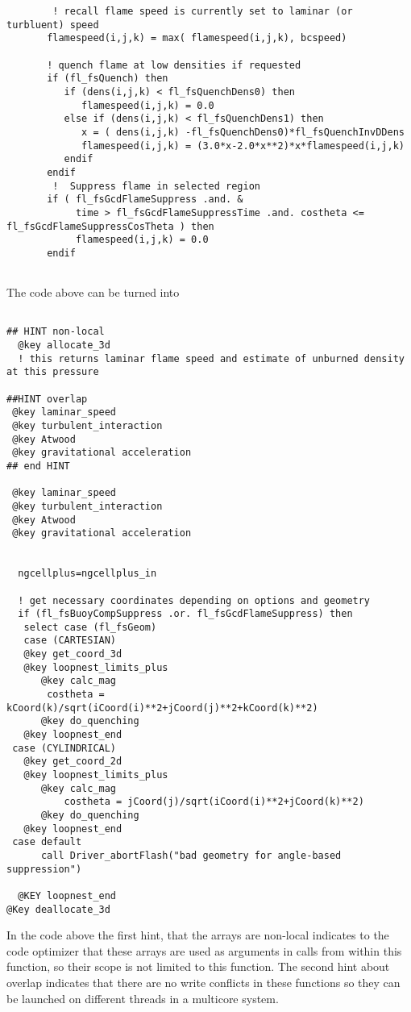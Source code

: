 \documentclass{article}
\begin{document}
\begin{verbatim}
        ! recall flame speed is currently set to laminar (or turbluent) speed
       flamespeed(i,j,k) = max( flamespeed(i,j,k), bcspeed)

       ! quench flame at low densities if requested
       if (fl_fsQuench) then
          if (dens(i,j,k) < fl_fsQuenchDens0) then
             flamespeed(i,j,k) = 0.0
          else if (dens(i,j,k) < fl_fsQuenchDens1) then
             x = ( dens(i,j,k) -fl_fsQuenchDens0)*fl_fsQuenchInvDDens
             flamespeed(i,j,k) = (3.0*x-2.0*x**2)*x*flamespeed(i,j,k)
          endif
       endif
        !  Suppress flame in selected region
       if ( fl_fsGcdFlameSuppress .and. &
            time > fl_fsGcdFlameSuppressTime .and. costheta <= fl_fsGcdFlameSuppressCosTheta ) then
            flamespeed(i,j,k) = 0.0
       endif


\end{verbatim}


The code above can be turned into
\begin{verbatim}

## HINT non-local
  @key allocate_3d
  ! this returns laminar flame speed and estimate of unburned density
at this pressure

##HINT overlap
 @key laminar_speed
 @key turbulent_interaction
 @key Atwood
 @key gravitational acceleration
## end HINT

 @key laminar_speed
 @key turbulent_interaction
 @key Atwood
 @key gravitational acceleration


  ngcellplus=ngcellplus_in

  ! get necessary coordinates depending on options and geometry
  if (fl_fsBuoyCompSuppress .or. fl_fsGcdFlameSuppress) then
   select case (fl_fsGeom)
   case (CARTESIAN)
   @key get_coord_3d
   @key loopnest_limits_plus
      @key calc_mag
       costheta = kCoord(k)/sqrt(iCoord(i)**2+jCoord(j)**2+kCoord(k)**2)
      @key do_quenching
   @key loopnest_end
 case (CYLINDRICAL)
   @key get_coord_2d
   @key loopnest_limits_plus
      @key calc_mag
          costheta = jCoord(j)/sqrt(iCoord(i)**2+jCoord(k)**2)
      @key do_quenching
   @key loopnest_end
 case default
      call Driver_abortFlash("bad geometry for angle-based suppression")

  @KEY loopnest_end
@Key deallocate_3d
\end{verbatim}

In the code above the first hint, that the arrays are non-local
indicates to the code optimizer that these arrays are used as
arguments in calls from within this function, so their scope is not
limited to this function. The second hint about overlap indicates that
there are no write conflicts in these functions so they can be
launched on different threads in a multicore system.
\end{document}

